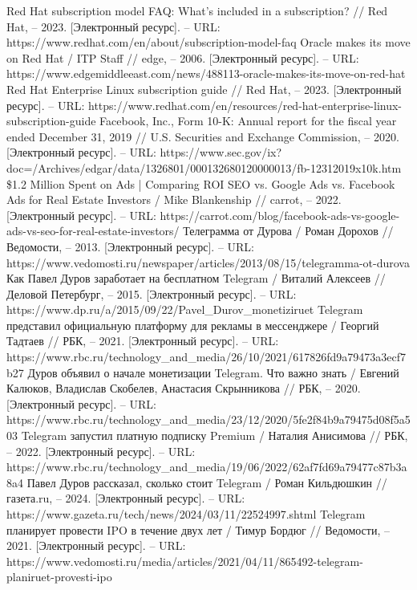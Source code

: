 \documentclass{article}
\begin{document}
\begin{thebibliography}{2}
 Red Hat subscription model FAQ: What's included in a subscription? // Red Hat, – 2023. [Электронный ресурс]. – URL: https://www.redhat.com/en/about/subscription-model-faq
 Oracle makes its move on Red Hat / ITP Staff // edge, – 2006. [Электронный ресурс]. – URL: https://www.edgemiddleeast.com/news/488113-oracle-makes-its-move-on-red-hat
 Red Hat Enterprise Linux subscription guide // Red Hat, – 2023. [Электронный ресурс]. – URL: https://www.redhat.com/en/resources/red-hat-enterprise-linux-subscription-guide
 Facebook, Inc., Form 10-K: Annual report for the fiscal year ended December 31, 2019 // U.S. Securities and Exchange Commission, – 2020. [Электронный ресурс]. – URL: https://www.sec.gov/ix?doc=/Archives/edgar/data/1326801/000132680120000013/fb-12312019x10k.htm
 \$1.2 Million Spent on Ads | Comparing ROI SEO vs. Google Ads vs. Facebook Ads for Real Estate Investors / Mike Blankenship // carrot, – 2022. [Электронный ресурс]. – URL: https://carrot.com/blog/facebook-ads-vs-google-ads-vs-seo-for-real-estate-investors/
 Телеграмма от Дурова / Роман Дорохов // Ведомости, – 2013. [Электронный ресурс]. – URL: https://www.vedomosti.ru/newspaper/articles/2013/08/15/telegramma-ot-durova
 Как Павел Дуров заработает на бесплатном Telegram / Виталий Алексеев // Деловой Петербург, – 2015. [Электронный ресурс]. – URL: https://www.dp.ru/a/2015/09/22/Pavel\_Durov\_monetiziruet
 Telegram представил официальную платформу для рекламы в мессенджере / Георгий Тадтаев // РБК, – 2021. [Электронный ресурс]. – URL: https://www.rbc.ru/technology\_and\_media/26/10/2021/617826fd9a79473a3ecf7b27
 Дуров объявил о начале монетизации Telegram. Что важно знать / Евгений Калюков, Владислав Скобелев, Анастасия Скрынникова // РБК, – 2020. [Электронный ресурс]. – URL: https://www.rbc.ru/technology\_and\_media/23/12/2020/5fe2f84b9a79475d08f5a503
 Telegram запустил платную подписку Premium / Наталия Анисимова // РБК, – 2022. [Электронный ресурс]. – URL: https://www.rbc.ru/technology\_and\_media/19/06/2022/62af7fd69a79477c87b3a8a4
 Павел Дуров рассказал, сколько стоит Telegram / Роман Кильдюшкин // газета.ru, – 2024. [Электронный ресурс]. – URL: https://www.gazeta.ru/tech/news/2024/03/11/22524997.shtml
 Telegram планирует провести IPO в течение двух лет / Тимур Бордюг // Ведомости, – 2021. [Электронный ресурс]. – URL: https://www.vedomosti.ru/media/articles/2021/04/11/865492-telegram-planiruet-provesti-ipo

\end{thebibliography}
\end{document}
